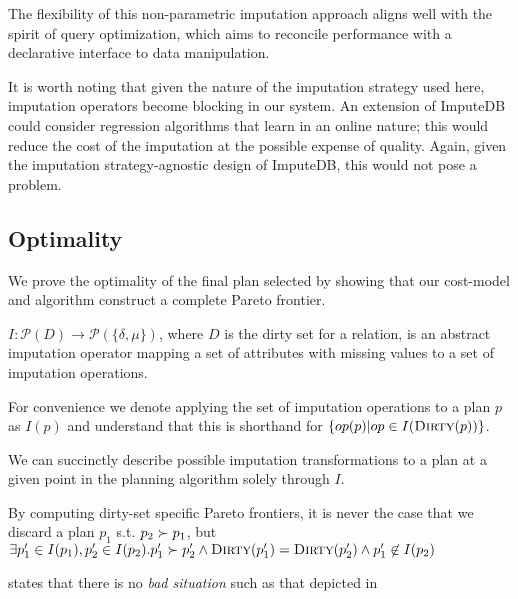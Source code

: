 The flexibility of this non-parametric imputation approach aligns well with the spirit of
query optimization, which aims to reconcile performance with a declarative interface to data
manipulation. 

It is worth noting that given the nature of the imputation strategy used here, imputation
operators become blocking in our system. An extension of ImputeDB could consider regression
algorithms that learn in an online nature; this would reduce the cost of the imputation at
the possible expense of quality. Again, given the imputation strategy-agnostic design of
ImputeDB, this would not pose a problem.

%    

\subsection{Optimality}\label{sec:optimal}
We prove the optimality of the final plan selected by showing that our cost-model and algorithm
construct a complete Pareto frontier.

\begin{definition}
$I: \mathcal{P}(D) \rightarrow \mathcal{P}(\{ \delta, \mu \})$, where
$D$ is the dirty set for a relation, is an abstract imputation operator mapping a set of
attributes with missing values to a set of imputation operations.

For convenience we denote applying the set of imputation operations to a plan $p$ as $I(p)$ and understand that this
is shorthand for $\{ op(p)   | op \in I(\textsc{Dirty}(p)) \}$.
\end{definition}

We can succinctly describe possible imputation transformations to a plan at a given point in the planning algorithm solely through $I$.

\begin{theorem}\label{theorem:no-bad-sit}
By computing dirty-set specific Pareto frontiers, it is never the case that we discard a plan $p_1$ s.t. $p_2 \succ p_1$, but 
$\exists p_1' \in I(p_1), p_2' \in I(p_2). p_1' \succ p_2' \land \textsc{Dirty}(p_1') = \textsc{Dirty}(p_2') \land p_1' \not \in I(p_2)$
\end{theorem}

 states that there is no \textit{bad situation} such as that depicted in~


